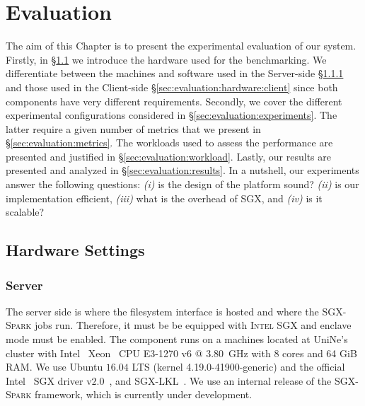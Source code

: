 \chapter{Evaluation} \label{chap:evaluation}

The aim of this Chapter is to present the experimental evaluation of our system.
Firstly, in \S\ref{sec:evaluation:hardware} we introduce the hardware used for the benchmarking.
We differentiate between the machines and software used in the Server-side \S\ref{sec:evaluation:hardware:server} and those used in the Client-side \S\ref{sec:evaluation:hardware:client} since both components have very different requirements.
Secondly, we cover the different experimental configurations considered in \S\ref{sec:evaluation:experiments}.
The latter require a given number of metrics that we present in \S\ref{sec:evaluation:metrics}.
The workloads used to assess the performance are presented and justified in \S\ref{sec:evaluation:workload}.
Lastly, our results are presented and analyzed in \S\ref{sec:evaluation:results}.
In a nutshell, our experiments answer the following questions: \emph{(i)} is the design of the platform sound? \emph{(ii)} is our implementation efficient, \emph{(iii)} what is the overhead of SGX, and \emph{(iv)} is it scalable?

\section{Hardware Settings} \label{sec:evaluation:hardware}

\subsection{Server} \label{sec:evaluation:hardware:server}
The server side is where the filesystem interface is hosted and where the \textsc{SGX-Spark} jobs run.
Therefore, it must be be equipped with \textsc{Intel SGX} and enclave mode must be enabled. 
The component runs on a machines located at UniNe's cluster with Intel~\textregistered\xspace Xeon~\textregistered\xspace CPU E3-1270 v6 @ $3.80$~GHz with 8 cores and 64 GiB RAM. 
We use Ubuntu $16.04$ LTS (kernel 4.19.0-41900-generic) and the official Intel~\textregistered\xspace SGX driver v$2.0$~\cite{sgx-driver}, and \textsc{SGX-LKL}~\cite{sgx-lkl}. 
We use an internal release of the \textsc{SGX-Spark} framework, which is currently under development.


